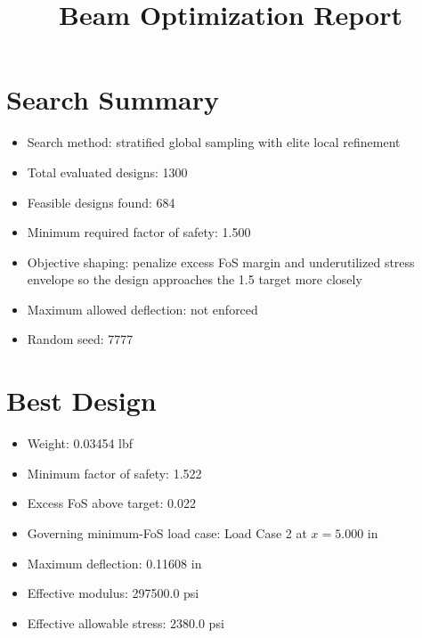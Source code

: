 \documentclass[11pt]{article}
\title{Beam Optimization Report}
\date{}
\begin{document}
\maketitle

\section*{Search Summary}
\begin{itemize}
\item Search method: stratified global sampling with elite local refinement
\item Total evaluated designs: 1300
\item Feasible designs found: 684
\item Minimum required factor of safety: 1.500
\item Objective shaping: penalize excess FoS margin and underutilized stress envelope so the design approaches the 1.5 target more closely
\item Maximum allowed deflection: not enforced
\item Random seed: 7777
\end{itemize}

\section*{Best Design}
\begin{itemize}
\item Weight: 0.03454 lbf
\item Minimum factor of safety: 1.522
\item Excess FoS above target: 0.022
\item Governing minimum-FoS load case: Load Case 2 at $x=5.000$ in
\item Maximum deflection: 0.11608 in
\item Effective modulus: 297500.0 psi
\item Effective allowable stress: 2380.0 psi
\end{itemize}
\end{document}
